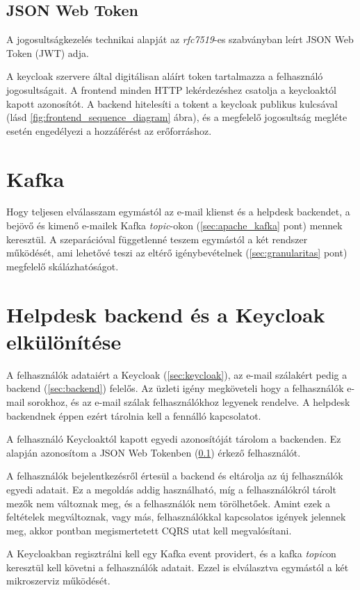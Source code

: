 \subsection{JSON Web Token}\label{sec:JWT}
A jogosultságkezelés technikai alapját az \textit{rfc7519}-es szabványban \cite{rfc7519_JSON_Web_Token} leírt JSON Web Token (JWT) adja. 

A keycloak szervere által digitálisan aláírt token tartalmazza a felhasználó jogosultságait. A frontend minden HTTP lekérdezéshez csatolja a keycloaktól kapott azonosítót. A backend hitelesíti a tokent a keycloak publikus kulcsával (lásd \ref{fig:frontend_sequence_diagram} ábra), és a megfelelő jogosultság megléte esetén engedélyezi a hozzáférést az erőforráshoz.


\section{Kafka}
Hogy teljesen elválasszam egymástól az e-mail klienst és a helpdesk backendet, a bejövő és kimenő e-mailek Kafka \textit{topic}-okon (\ref{sec:apache_kafka} pont) mennek keresztül. A szeparációval függetlenné teszem egymástól a két rendszer működését, ami lehetővé teszi az eltérő igénybevételnek (\ref{sec:granularitas} pont) megfelelő skálázhatóságot.




\section{Helpdesk backend és a Keycloak elkülönítése}
A felhasználók adataiért a Keycloak (\ref{sec:keycloak}), az e-mail szálakért pedig a backend (\ref{sec:backend}) felelős. Az üzleti igény megköveteli hogy a felhasználók e-mail sorokhoz, és az e-mail szálak felhasználókhoz legyenek rendelve. A helpdesk backendnek éppen ezért tárolnia kell a fennálló kapcsolatot.

A felhasználó Keycloaktól kapott egyedi azonosítóját tárolom a backenden. Ez alapján azonosítom a JSON Web Tokenben (\ref{sec:JWT}) érkező felhasználót.

A felhasználók bejelentkezésről értesül a backend és eltárolja az új felhasználók egyedi adatait. Ez a megoldás addig használható, míg a felhasználókról tárolt mezők nem változnak meg, és a felhasználók nem törölhetőek. Amint ezek a feltételek megváltoznak, vagy  más, felhasználókkal kapcsolatos igények jelennek meg, akkor  pontban megismertetett CQRS utat kell megvalósítani.
	

A Keycloakban regisztrálni kell egy Kafka event providert, és a kafka \textit{topic}on  keresztül kell követni a felhasználók adatait. Ezzel is elválasztva egymástól a két mikroszerviz működését.

